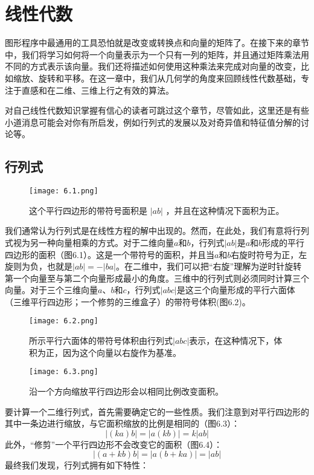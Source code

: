 \documentclass[lang=cn,12pt]{elegantbook}
\begin{document}
\chapter{线性代数}

图形程序中最通用的工具恐怕就是改变或转换点和向量的矩阵了。在接下来的章节中，我们将学习如何将一个向量表示为一个只有一列的矩阵，并且通过矩阵乘法用不同的方式表示该向量。我们还将描述如何使用这种乘法来完成对向量的改变，比如缩放、旋转和平移。在这一章中，我们从几何学的角度来回顾线性代数基础，专注于直感和在二维、三维上行之有效的算法。

对自己线性代数知识掌握有信心的读者可跳过这个章节，尽管如此，这里还是有些小道消息可能会对你有所启发，例如行列式的发展以及对奇异值和特征值分解的讨论等。

\section{行列式}

\begin{figure}[htbp]
\centering
\texttt{[image: 6.1.png]}
\caption{这个平行四边形的带符号面积是 $|ab|$ ，并且在这种情况下面积为正。}
\end{figure}

我们通常认为行列式是在线性方程的解中出现的。然而，在此处，我们有意将行列式视为另一种向量相乘的方式。对于二维向量$a$和$b$，行列式$|ab|$是$a$和$b$形成的平行四边形的面积（图6.1）。这是一个带符号的面积，并且当$a$和$b$右旋时符号为正，左旋则为负，也就是$|ab| = -|ba|$。在二维中，我们可以把“右旋”理解为逆时针旋转第一个向量至与第二个向量形成最小的角度。三维中的行列式则必须同时计算三个向量。对于三个三维向量$a$、$b$和$c$，行列式$|abc|$是这三个向量形成的平行六面体（三维平行四边形；一个修剪的三维盒子）的带符号体积(图6.2)。

\begin{figure}[htbp]
\centering
\texttt{[image: 6.2.png]}
\caption{所示平行六面体的带符号体积由行列式$|abc|$表示，在这种情况下，体积为正，因为这个向量以右旋作为基准。}
\end{figure}

\begin{figure}[htbp]
\centering
\texttt{[image: 6.3.png]}
\caption{沿一个方向缩放平行四边形会以相同比例改变面积。}
\end{figure}

要计算一个二维行列式，首先需要确定它的一些性质。我们注意到对平行四边形的其中一条边进行缩放，与它面积缩放的比例是相同的（图6.3）：$$|(ka)b| =  |a(kb)| = k|ab|$$此外，“修剪”一个平行四边形不会改变它的面积（图6.4）：$$|(a+kb)b| =  |a(b+ka)| = |ab|$$最终我们发现，行列式拥有如下特性：
\end{document}
